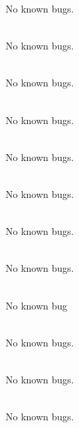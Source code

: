 \begin{DoxyRefList}
\label{bug__bug000050}%
%
No known bugs.  
\item[File \doxylink{_az_el_pa_8hpp}{Az\+El\+Pa.hpp} ]\hfill \\
\label{bug__bug000006}%
%
No known bugs.  
\item[File \doxylink{_cheb3_d_8cpp}{Cheb3D.cpp} ]\hfill \\
\label{bug__bug000051}%
%
No known bugs.  
\item[File \doxylink{_cheb3_d_8hpp}{Cheb3D.hpp} ]\hfill \\
\label{bug__bug000007}%
%
No known bugs.  
\item[File \doxylink{_d_e_integ_8cpp}{DEInteg.cpp} ]\hfill \\
\label{bug__bug000052}%
%
No known bugs.  
\item[File \doxylink{_d_e_integ_8hpp}{DEInteg.hpp} ]\hfill \\
\label{bug__bug000008}%
%
No known bugs.  
\item[File \doxylink{_ecc_anom_8cpp}{Ecc\+Anom.cpp} ]\hfill \\
\label{bug__bug000053}%
%
No known bugs.  
\item[File \doxylink{_ecc_anom_8hpp}{Ecc\+Anom.hpp} ]\hfill \\
\label{bug__bug000009}%
%
No known bugs.  
\item[File \doxylink{_e_f_k___g_e_o_s3_8cpp}{EFK\+\_\+\+GEOS3.cpp} ]\hfill \\
\label{bug__bug000088}%
%
No known bug  
\item[File \doxylink{elements_8cpp}{elements.cpp} ]\hfill \\
\label{bug__bug000054}%
%
No known bugs.  
\item[File \doxylink{elements_8hpp}{elements.hpp} ]\hfill \\
\label{bug__bug000010}%
%
No known bugs.  
\item[File \doxylink{_eqn_equinox_8cpp}{Eqn\+Equinox.cpp} ]\hfill \\
\label{bug__bug000055}%
%
No known bugs.  
\item[File \doxylink{_eqn_equinox_8hpp}{Eqn\+Equinox.hpp} ]\hfill \\
\label{bug__bug000011}%

\end{DoxyRefList}
